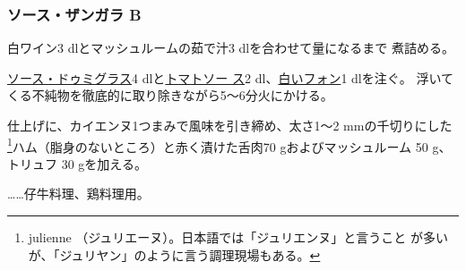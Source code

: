 \begin{recette}
{\subsubsection{ソース・ザンガラ B}\label{sauce-zingara-b}}



白ワイン3 dlとマッシュルームの茹で汁3 dlを合わせて\untiers{}量になるまで
煮詰める。

\protect\hyperlink{sauce-demi-glace}{ソース・ドゥミグラス}4
dlと\protect\hyperlink{sauce-tomate}{トマトソー ス}2\undemi{}
dl、\protect\hyperlink{fonds-blanc}{白いフォン}1 dlを注ぐ。
浮いてくる不純物を徹底的に取り除きながら5〜6分火にかける。

仕上げに、カイエンヌ1つまみで風味を引き締め、太さ1〜2 mmの千切りにした
\footnote{julienne
  （ジュリエーヌ）。日本語では「ジュリエンヌ」と言うこと
  が多いが、「ジュリヤン」のように言う調理現場もある。}ハム（脂身のないところ）と赤く漬けた舌肉70
gおよびマッシュルーム 50 g、トリュフ 30 gを加える。

\ldots{}\ldots{}仔牛料理、鶏料理用。
\end{recette}